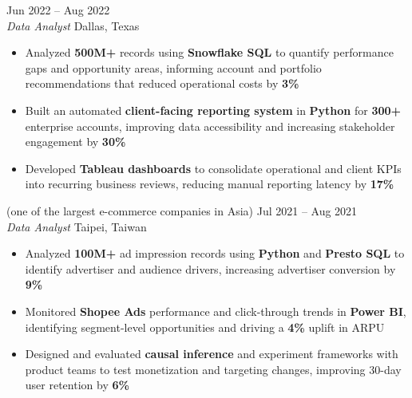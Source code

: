 \documentclass[11pt,letterpaper]{article}
\begin{document}
\vspace{0.35\baselineskip}  %
 \hfill Jun 2022 -- Aug 2022\\[-1pt]
\textit{Data Analyst} \hfill Dallas, Texas
\begin{itemize}[leftmargin=1.5em, rightmargin=0pt, itemsep=-1pt, topsep=0pt, parsep=0pt]
  \item \justifying Analyzed \textbf{500M+} records using \textbf{Snowflake SQL} to quantify performance gaps and opportunity areas, informing account and portfolio recommendations that reduced operational costs by \textbf{3\%}
  \item \justifying Built an automated \textbf{client-facing reporting system} in \textbf{Python} for \textbf{300+} enterprise accounts, improving data accessibility and increasing stakeholder engagement by \textbf{30\%}
  \item \justifying Developed \textbf{Tableau dashboards} to consolidate operational and client KPIs into recurring business reviews, reducing manual reporting latency by \textbf{17\%}
\end{itemize}

\vspace{0.35\baselineskip}  %
 (one of the largest e-commerce companies in Asia) \hfill Jul 2021 -- Aug 2021\\[-1pt]
\textit{Data Analyst} \hfill Taipei, Taiwan
\begin{itemize}[leftmargin=1.5em, rightmargin=0pt, itemsep=-1pt, topsep=0pt, parsep=0pt]
  \item \justifying Analyzed \textbf{100M+} ad impression records using \textbf{Python} and \textbf{Presto SQL} to identify advertiser and audience drivers, increasing advertiser conversion by \textbf{9\%}
  \item \justifying Monitored \textbf{Shopee Ads} performance and click-through trends in \textbf{Power BI}, identifying segment-level opportunities and driving a \textbf{4\%} uplift in ARPU
  \item \justifying Designed and evaluated \textbf{causal inference} and experiment frameworks with product teams to test monetization and targeting changes, improving 30-day user retention by \textbf{6\%}
\end{itemize}
\end{document}
